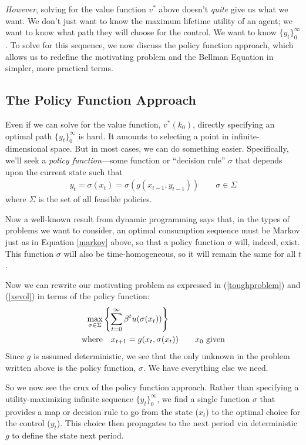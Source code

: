 \documentclass[a4paper,12pt]{scrartcl}
\begin{document}
\emph{However}, solving for the value function $v^*$ above doesn't
\emph{quite} give us what we want. We don't just want to know the
maximum lifetime utility of an agent; we want to know what path they
will choose for the control. We want to know $\{y_t\}_0^\infty$. To
solve for this sequence, we now discuss the policy function approach,
which allows us to redefine the motivating problem and the Bellman
Equation in simpler, more practical terms. 


\subsection{The Policy Function Approach}

Even if we can solve for the value function, $v^*(k_0)$, directly specifying an
optimal path $\{y_t\}_0^\infty$ is hard. It amounts to
selecting a point in infinite-dimensional space.  But in most cases,
we can do something easier. Specifically, we'll seek a \emph{policy
function}---some function or ``decision rule'' $\sigma$ that depends
upon the current state such that 
\begin{align}
  \label{markov}
  y_t = \sigma(x_t) = \sigma(g(x_{t-1}, y_{t-1}))
  \qquad \sigma \in \Sigma
\end{align}
where $\Sigma$ is the set of all feasible policies. 

Now a well-known result from dynamic programming says that, in the
types of problems we want to consider, an optimal consumption sequence
must be Markov just as in Equation \ref{markov} above, so that a
policy function $\sigma$ will, indeed, exist.  This function $\sigma$
will also be time-homogeneous, so it will remain the same for all $t$.

Now we can rewrite our motivating problem as expressed in
(\ref{toughproblem}) and (\ref{xevol}) in terms of the policy
function:
\begin{align}
  \label{policyapproach}
  \max_{\sigma \in \Sigma} 
  &\left\{ \sum^\infty_{t=0} \beta^t u(\sigma(x_t)) \right\}\\
  \text{where} &\quad
  x_{t+1} = g(x_t, \sigma(x_t)) 
  \qquad \text{$x_0$ given}
  \notag
\end{align}
Since $g$ is assumed deterministic, we see that the only unknown in
the problem written above is the policy function, $\sigma$. We have
everything else we need.

So we now see the crux of the policy function approach. Rather than
specifying a utility-maximizing infinite sequence $\{y_t\}^\infty_0$,
we find a single function $\sigma$ that provides a map or decision
rule to go from the state ($x_t$) to the optimal choice for the
control ($y_t$).  This choice then propagates to the next period via
deterministic $g$ to define the state next period.
\end{document}
